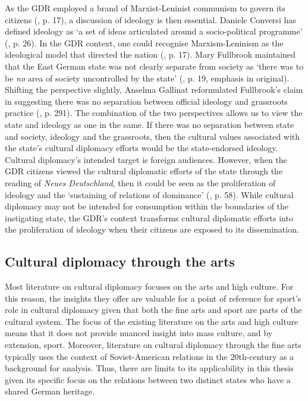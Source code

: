 As the GDR employed a brand of Marxist-Leninist communism to govern its citizens (\cite{grixcooke2002}, p. 17), a discussion of ideology is then essential. Daniele Conversi has defined ideology as ‘a set of ideas articulated around a socio-political programme’ (\citeyear{conversi2010}, p. 26). In the GDR context, one could recognise Marxism-Leninism as the ideological model that directed the nation (\cite{grixcooke2002}, p. 17). Mary Fullbrook maintained that the East German state was not clearly separate from society as ‘there was to be \textit{no} area of society uncontrolled by the state’ (\citeyear{fullbrook1995}, p. 19, emphasis in original). Shifting the perspective slightly, Anselma Gallinat reformulated Fullbrook’s claim in suggesting there was no separation between official ideology and grassroots practice (\citeyear{gallinat2005}, p. 291). The combination of the two perspectives allows us to view the state and ideology as one in the same. If there was no separation between state and society, ideology and the grassroots, then the cultural values associated with the state’s cultural diplomacy efforts would be the state-endorsed ideology. Cultural diplomacy’s intended target is foreign audiences. However, when the GDR citizens viewed the cultural diplomatic efforts of the state through the reading of \textit{Neues Deutschland}, then it could be seen as the proliferation of ideology and the ‘sustaining of relations of dominance’ (\cite{thompson1990}, p. 58). While cultural diplomacy may not be intended for consumption within the boundaries of the instigating state, the GDR’s context transforms cultural diplomatic efforts into the proliferation of ideology when their citizens are exposed to its dissemination.

\subsection*{Cultural diplomacy through the arts}

Most literature on cultural diplomacy focuses on the arts and high culture. For this reason, the insights they offer are valuable for a point of reference for sport’s role in cultural diplomacy given that both the fine arts and sport are parts of the cultural system. The focus of the existing literature on the arts and high culture means that it does not provide nuanced insight into mass culture, and by extension, sport. Moreover, literature on cultural diplomacy through the fine arts typically uses the context of Soviet-American relations in the 20th-century as a background for analysis. Thus, there are limits to its applicability in this thesis given its specific focus on the relations between two distinct states who have a shared German heritage.

